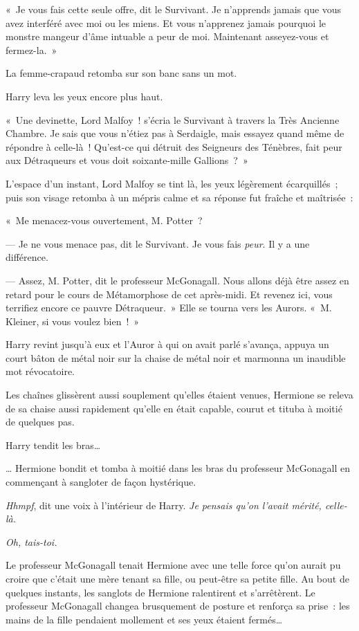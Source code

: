 «~Je vous fais cette seule offre, dit le Survivant. Je n'apprends jamais que vous avez interféré avec moi ou les miens. Et vous n'apprenez jamais pourquoi le monstre mangeur d'âme intuable a peur de moi. Maintenant asseyez-vous et fermez-la.~»

La femme-crapaud retomba sur son banc sans un mot.

Harry leva les yeux encore plus haut.

«~Une devinette, Lord Malfoy~! s'écria le Survivant à travers la Très Ancienne Chambre. Je sais que vous n'étiez pas à Serdaigle, mais essayez quand même de répondre à celle-là~! Qu'est-ce qui détruit des Seigneurs des Ténèbres, fait peur aux Détraqueurs et vous doit soixante-mille Gallions~?~»

L'espace d'un instant, Lord Malfoy se tint là, les yeux légèrement écarquillés~; puis son visage retomba à un mépris calme et sa réponse fut fraîche et maîtrisée~:

«~Me menacez-vous ouvertement, M. Potter~?

--- Je ne vous menace pas, dit le Survivant. Je vous fais \emph{peur}. Il y a une différence.

--- Assez, M. Potter, dit le professeur McGonagall. Nous allons déjà être assez en retard pour le cours de Métamorphose de cet après-midi. Et revenez ici, vous terrifiez encore ce pauvre Détraqueur.~» Elle se tourna vers les Aurors. «~M. Kleiner, si vous voulez bien~!~»

Harry revint jusqu'à eux et l'Auror à qui on avait parlé s'avança, appuya un court bâton de métal noir sur la chaise de métal noir et marmonna un inaudible mot révocatoire.

Les chaînes glissèrent aussi souplement qu'elles étaient venues, Hermione se releva de sa chaise aussi rapidement qu'elle en était capable, courut et tituba à moitié de quelques pas.

Harry tendit les bras…

… Hermione bondit et tomba à moitié dans les bras du professeur McGonagall en commençant à sangloter de façon hystérique.

\emph{Hhmpf}, dit une voix à l'intérieur de Harry. \emph{Je pensais qu'on l'avait mérité, celle-là.}

\emph{Oh, tais-toi.}

Le professeur McGonagall tenait Hermione avec une telle force qu'on aurait pu croire que c'était une mère tenant sa fille, ou peut-être sa petite fille. Au bout de quelques instants, les sanglots de Hermione ralentirent et s'arrêtèrent. Le professeur McGonagall changea brusquement de posture et renforça sa prise~: les mains de la fille pendaient mollement et ses yeux étaient fermés…

